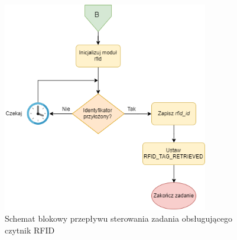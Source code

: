             \begin{figure}[]
                \centering
                \includegraphics[width=0.8\textwidth]{chapters/images/flowchart3.png}
                \caption{Schemat blokowy przepływu sterowania zadania obsługującego czytnik RFID}
                \label{fig:flowchart3}
            \end{figure}








